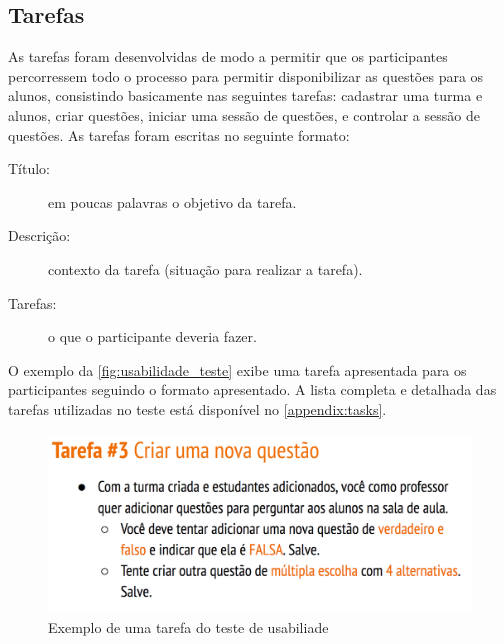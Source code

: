 \subsection{Tarefas}

As tarefas foram desenvolvidas de modo a permitir que os participantes
percorressem todo o processo para permitir disponibilizar as questões para os alunos,
consistindo basicamente nas seguintes tarefas: cadastrar uma turma e alunos, criar questões, iniciar uma sessão de questões,
e controlar a sessão de questões. As tarefas foram escritas no seguinte formato:

\begin{description}
  \item[Título:] em poucas palavras o objetivo da tarefa.
  \item[Descrição:] contexto da tarefa (situação para realizar a tarefa).
  \item[Tarefas:] o que o participante deveria fazer.
\end{description}

O exemplo da \autoref{fig:usabilidade_teste} exibe uma tarefa apresentada para
os participantes seguindo o formato apresentado. A lista completa e detalhada das tarefas
utilizadas no teste está disponível no \autoref{appendix:tasks}.

\begin{figure}[!ht]
  \centering
  \caption{Exemplo de uma tarefa do teste de usabiliade}
  \label{fig:usabilidade_teste}
  \includegraphics[scale=0.35]{imagens/usability_task}
  \doautor
\end{figure}

